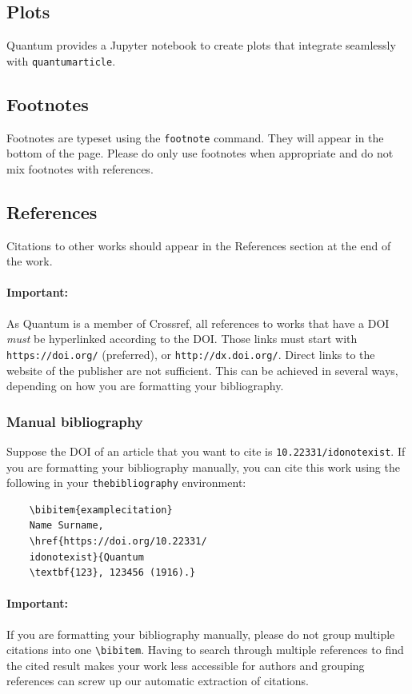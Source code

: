 \documentclass[a4paper,noarxiv,onecolumn]{quantumarticle}
\begin{document}
	\subsection{Plots}
	Quantum provides a Jupyter notebook to create plots that integrate seamlessly with \texttt{quantumarticle}.

	\subsection{Footnotes}
	Footnotes are typeset using the \texttt{footnote} command. They will appear in the bottom of the page. Please do only use footnotes when appropriate and do not mix footnotes with references.

	\subsection{References}
	Citations to other works should appear in the References section at the end of the work.

	\paragraph{Important:} As Quantum is a member of Crossref, all references to works that have a DOI \emph{must} be hyperlinked according to the DOI. Those links must start with \texttt{https://doi.org/} (preferred), or \texttt{http://dx.doi.org/}. Direct links to the website of the publisher are not sufficient. This can be achieved in several ways, depending on how you are formatting your bibliography.

	\subsubsection{Manual bibliography}
	Suppose the DOI of an article that you want to cite is \texttt{10.22331/idonotexist}. If you are formatting your bibliography manually, you can cite this work using the following in your \texttt{thebibliography} environment:
	\begin{verbatim}
	\bibitem{examplecitation}
	Name Surname,
	\href{https://doi.org/10.22331/
	idonotexist}{Quantum
	\textbf{123}, 123456 (1916).}
	\end{verbatim}

	\paragraph{Important:} If you are formatting your bibliography manually, please do not group multiple citations into one \texttt{\textbackslash{}bibitem}.
	Having to search through multiple references to find the cited result makes your work less accessible for authors and grouping references can screw up our automatic extraction of citations.
\end{document}
